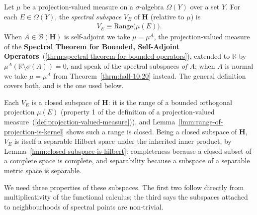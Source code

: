 \begin{definition}
    \label{def:hall-7.14}
    \leanok
    Let $\mu$ be a projection-valued measure on a $\sigma$-algebra $\Omega(Y)$ over a set $Y$. For each $E \in \Omega(Y)$, the \textit{spectral subspace} $V_E$ of $\mathbf{H}$ (relative to $\mu$) is
    \begin{align}
        V_E \equiv \text{Range}\big( \mu(E) \big).
    \end{align}
    When $A \in \mathcal{B}(\mathbf{H})$ is self-adjoint we take $\mu = \mu^A$, the projection-valued measure of the \textbf{Spectral Theorem for Bounded, Self-Adjoint Operators}~(\ref{thrm:spectral-theorem-for-bounded-operators}), extended to $\mathbb{R}$ by $\mu^A(\mathbb{R}\setminus\sigma(A)) = 0$, and speak of the spectral subspaces \textit{of $A$}; when $A$ is normal we take $\mu = \mu^A$ from Theorem~\ref{thrm:hall-10.20} instead. The general definition covers both, and is the one used below.

    Each $V_E$ is a closed subspace of $\mathbf{H}$: it is the range of a bounded orthogonal projection $\mu(E)$ (property 1 of the definition of a projection-valued measure~(\ref{def:projection-valued-measure})), and Lemma~\ref{lmm:range-of-projection-is-kernel} shows such a range is closed. Being a closed subspace of $\mathbf{H}$, $V_E$ is itself a separable Hilbert space under the inherited inner product, by Lemma~\ref{lmm:closed-subspace-is-hilbert}: completeness because a closed subset of a complete space is complete, and separability because a subspace of a separable metric space is separable.
\end{definition}

We need three properties of these subspaces. The first two follow directly from multiplicativity of the functional calculus; the third says the subspaces attached to neighbourhoods of spectral points are non-trivial.

